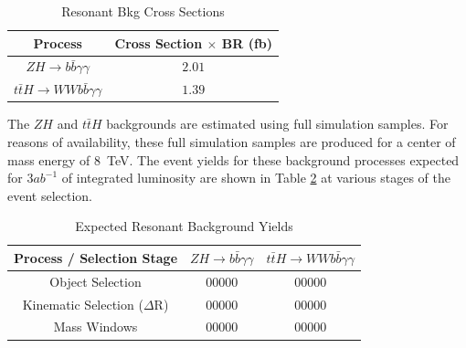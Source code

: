 \documentclass{cmspaper}
\begin{document}
\begin{table}[!ht]
\begin{center} 
\begin{tabular}{|c|c|}
\hline
Process                                           &   Cross Section $\times$ BR (fb)   \\  \hline
$ZH \rightarrow b\bar{b}\gamma\gamma$             &   $2.01$                           \\\hline
$t\bar{t}H \rightarrow W W b \bar{b}\gamma\gamma$ &   $1.39$                           \\\hline

\end{tabular}
\caption{Resonant Bkg Cross Sections }
\label{tab:ResonantBkgCrossSections}
\end{center}
\end{table}

The $ZH$ and $t\bar{t}H$ backgrounds are estimated using full simulation samples. For reasons of 
availability, these full simulation samples are produced for a center of mass energy of $8$~TeV.
The event yields for these background processes expected for $3 ab^{-1}$ of integrated luminosity
are shown in Table \ref{tab:resonantBkgEventYields} at various stages of the event selection.

\begin{table}[!ht]
\begin{center} 
\begin{tabular}{|c|c|c|}
\hline
Process / Selection Stage       &  $ZH \rightarrow b\bar{b}\gamma\gamma$ &  $t\bar{t}H \rightarrow W W b \bar{b}\gamma\gamma$    \\  \hline
Object Selection                &  00000                                 &  00000                                                \\ 
Kinematic Selection ($\Delta$R) &  00000                                 &  00000                                                \\ 
Mass Windows                    &  00000                                 &  00000                                                \\ \hline

\end{tabular}
\caption{Expected Resonant Background Yields }
\label{tab:resonantBkgEventYields}
\end{center}
\end{table}


\end{document}
